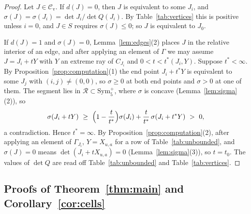 \documentclass[11pt,reqno]{amsart}
\renewcommand{\_}{\origunderscore\allowbreak}
\numberwithin{equation}{section}
\theoremstyle{plain}
\theoremstyle{definition}
\theoremstyle{remark}
\newcommand{\Rk}{\mathcal{R}}
\newcommand{\Sym}{\mathrm{Sym}}
\newcommand{\cand}{\mathcal{C}_{\mathrm{v}}}
\begin{document}
\begin{proof}
Let $J\in\cand$. If $d(J)=0$, then $J$ is equivalent to some $J_i$, and $\sigma(J)=\sigma(J_i)=\det J_i/\det Q(J_i)$. By Table~\ref{tab:vertices} this is positive unless $i=0$, and $J\in S$ requires $\sigma(J)\le0$; so $J$ is equivalent to $J_0$.

If $d(J)=1$ and $\sigma(J)=0$, Lemma~\ref{lem:edges}(2) places $J$ in the relative interior of an edge, and after applying an element of $\Gamma$ we may assume $J=J_i+tY$ with $Y$ an extreme ray of $C_{J_i}$ and $0<t<t^*(J_i,Y)$. Suppose $t^*<\infty$. By Proposition~\ref{prop:computation}(1) the end point $J_i+t^*Y$ is equivalent to some $J_j$ with $(i,j)\ne(0,0)$, so $\sigma\ge0$ at both end points and $\sigma>0$ at one of them. The segment lies in $\Rk\subset\Sym_5^+$, where $\sigma$ is concave (Lemma~\ref{lem:sigma}(2)), so
\[
\sigma(J_i+tY)\ \ge\ \Bigl(1-\frac t{t^*}\Bigr)\sigma(J_i)+\frac t{t^*}\,\sigma(J_i+t^*Y)\ >\ 0,
\]
a contradiction. Hence $t^*=\infty$. By Proposition~\ref{prop:computation}(2), after applying an element of $\Gamma_{J_i}$, $Y=X_{u,a}$ for a row of Table~\ref{tab:unbounded}, and $\sigma(J)=0$ means $\det(J_i+tX_{u,a})=0$ (Lemma~\ref{lem:sigma}(3)), so $t=t_0$. The values of $\det Q$ are read off Table~\ref{tab:unbounded} and Table~\ref{tab:vertices}.
\end{proof}

\subsection{Proofs of Theorem~\ref{thm:main} and Corollary~\ref{cor:cells}}\label{sec:proofs}
\end{document}
